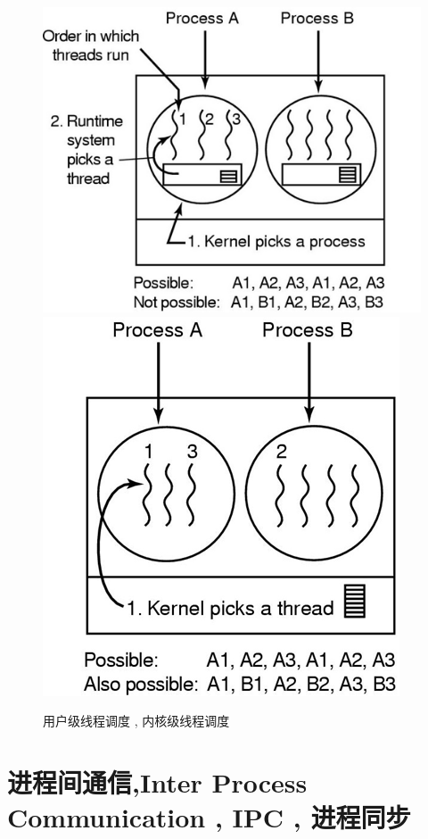 \documentclass[UTF8,a4paper]{ctexart}
\begin{document}
\begin{figure}[H]
	\centering
	\includegraphics[scale = 0.3]{assets/ModernOperatingSystems_b0cb9.png}
	\includegraphics[scale = 0.3]{assets/ModernOperatingSystems_98c42.png}
	\caption{用户级线程调度 , 内核级线程调度  }
\end{figure}

\section{进程间通信,Inter Process Communication , IPC , 进程同步}
\end{document}

